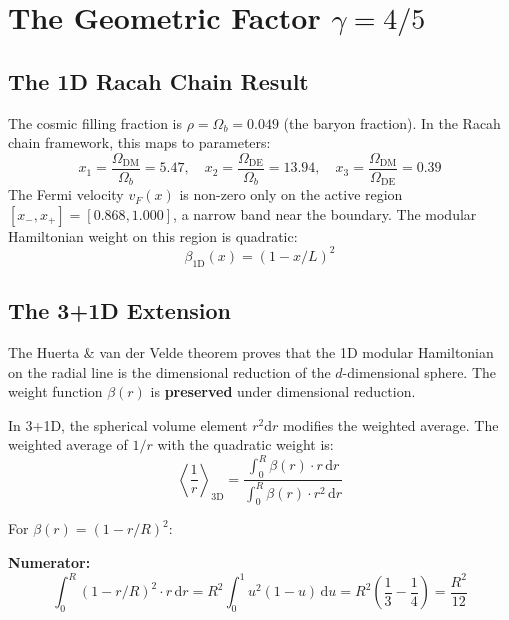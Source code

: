 \documentclass[11pt,letterpaper]{article}
\newcommand{\av}[1]{\left\langle #1 \right\rangle}
\begin{document}
\section{The Geometric Factor $\gamma = 4/5$}

\subsection{The 1D Racah Chain Result}

The cosmic filling fraction is $\rho = \Omega_b = 0.049$ (the baryon fraction).
In the Racah chain framework, this maps to parameters:
\begin{equation}
  x_1 = \frac{\Omega_{\mathrm{DM}}}{\Omega_b} = 5.47, \quad
  x_2 = \frac{\Omega_{\mathrm{DE}}}{\Omega_b} = 13.94, \quad
  x_3 = \frac{\Omega_{\mathrm{DM}}}{\Omega_{\mathrm{DE}}} = 0.39
  \label{eq:racah_params}
\end{equation}
The Fermi velocity $v_F(x)$ is non-zero only on the active region
$[x_-, x_+] = [0.868, 1.000]$, a narrow band near the boundary.
The modular Hamiltonian weight on this region is quadratic:
\begin{equation}
  \beta_{\mathrm{1D}}(x) = (1 - x/L)^2
  \label{eq:racah_1d}
\end{equation}

\subsection{The 3+1D Extension}

The Huerta \& van der Velde theorem proves that the 1D modular Hamiltonian
on the radial line is the dimensional reduction of the $d$-dimensional sphere.
The weight function $\beta(r)$ is \textbf{preserved} under dimensional reduction.

In 3+1D, the spherical volume element $r^2 \mathrm{d}r$ modifies the weighted average.
The weighted average of $1/r$ with the quadratic weight is:
\begin{equation}
  \av{\frac{1}{r}}_{\mathrm{3D}}
  = \frac{\int_0^R \beta(r) \cdot r \, \mathrm{d}r}
         {\int_0^R \beta(r) \cdot r^2 \, \mathrm{d}r}
  \label{eq:weighted_avg}
\end{equation}

For $\beta(r) = (1 - r/R)^2$:

\noindent\textbf{Numerator:}
\begin{equation}
  \int_0^R (1 - r/R)^2 \cdot r \, \mathrm{d}r
  = R^2 \int_0^1 u^2(1-u) \, \mathrm{d}u
  = R^2 \left(\frac{1}{3} - \frac{1}{4}\right)
  = \frac{R^2}{12}
  \label{eq:numerator}
\end{equation}
\end{document}
